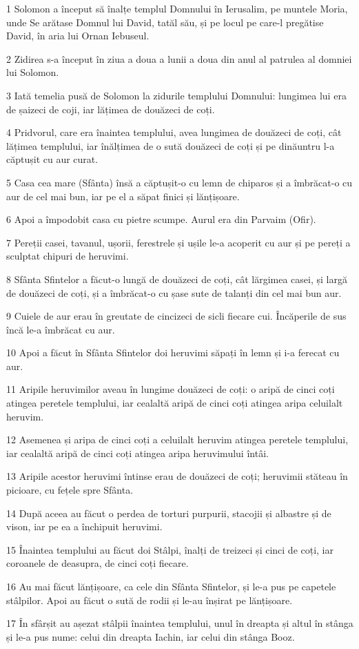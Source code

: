 \par 1 Solomon a început să înalțe templul Domnului în Ierusalim, pe muntele Moria, unde Se arătase Domnul lui David, tatăl său, și pe locul pe care-l pregătise David, în aria lui Ornan Iebuseul.
\par 2 Zidirea s-a început în ziua a doua a lunii a doua din anul al patrulea al domniei lui Solomon.
\par 3 Iată temelia pusă de Solomon la zidurile templului Domnului: lungimea lui era de șaizeci de coji, iar lățimea de douăzeci de coți.
\par 4 Pridvorul, care era înaintea templului, avea lungimea de douăzeci de coți, cât lățimea templului, iar înălțimea de o sută douăzeci de coți și pe dinăuntru l-a căptușit cu aur curat.
\par 5 Casa cea mare (Sfânta) însă a căptușit-o cu lemn de chiparos și a îmbrăcat-o cu aur de cel mai bun, iar pe el a săpat finici și lănțișoare.
\par 6 Apoi a împodobit casa cu pietre scumpe. Aurul era din Parvaim (Ofir).
\par 7 Pereții casei, tavanul, ușorii, ferestrele și ușile le-a acoperit cu aur și pe pereți a sculptat chipuri de heruvimi.
\par 8 Sfânta Sfintelor a făcut-o lungă de douăzeci de coți, cât lărgimea casei, și largă de douăzeci de coți, și a îmbrăcat-o cu șase sute de talanți din cel mai bun aur.
\par 9 Cuiele de aur erau în greutate de cincizeci de sicli fiecare cui. Încăperile de sus încă le-a îmbrăcat cu aur.
\par 10 Apoi a făcut în Sfânta Sfintelor doi heruvimi săpați în lemn și i-a ferecat cu aur.
\par 11 Aripile heruvimilor aveau în lungime douăzeci de coți: o aripă de cinci coți atingea peretele templului, iar cealaltă aripă de cinci coți atingea aripa celuilalt heruvim.
\par 12 Asemenea și aripa de cinci coți a celuilalt heruvim atingea peretele templului, iar cealaltă aripă de cinci coți atingea aripa heruvimului întâi.
\par 13 Aripile acestor heruvimi întinse erau de douăzeci de coți; heruvimii stăteau în picioare, cu fețele spre Sfânta.
\par 14 După aceea au făcut o perdea de torturi purpurii, stacojii și albastre și de vison, iar pe ea a închipuit heruvimi.
\par 15 Înaintea templului au făcut doi Stâlpi, înalți de treizeci și cinci de coți, iar coroanele de deasupra, de cinci coți fiecare.
\par 16 Au mai făcut lănțișoare, ca cele din Sfânta Sfintelor, și le-a pus pe capetele stâlpilor. Apoi au făcut o sută de rodii și le-au înșirat pe lănțișoare.
\par 17 În sfârșit au așezat stâlpii înaintea templului, unul în dreapta și altul în stânga și le-a pus nume: celui din dreapta Iachin, iar celui din stânga Booz.

